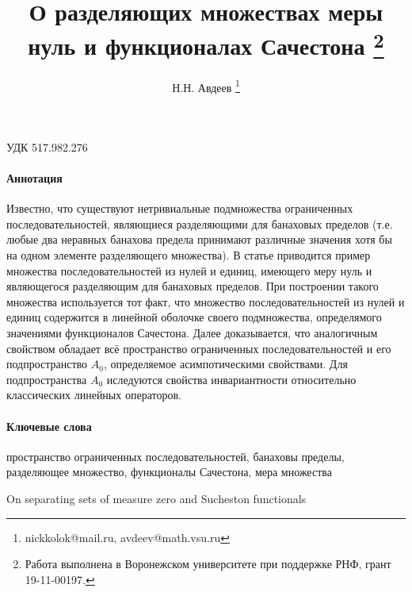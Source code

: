 \documentclass[a4paper,14pt]{article} %
\theoremstyle{plain}
\begin{document}

\title{
	О разделяющих множествах меры нуль и функционалах Сачестона
	\footnote{
		Работа выполнена в Воронежском университете при поддержке РНФ, грант 19-11-00197.
	}
}

\author{
	Н.Н. Авдеев
	\footnote{nickkolok@mail.ru, avdeev@math.vsu.ru}
}

\maketitle

УДК 517.982.276 %

\paragraph{Аннотация}
Известно, что существуют нетривиальные подмножества ограниченных последовательностей,
являющиеся разделяющими для банаховых пределов
(т.е. любые два неравных банахова предела принимают различные значения
хотя бы на одном элементе разделяющего множества).
В статье приводится пример множества последовательностей из нулей и единиц,
имеющего меру нуль и являющегося разделяющим для банаховых пределов.
При построении такого множества используется тот факт, что множество последовательностей
из нулей и единиц содержится в линейной оболочке своего подмножества,
определямого значениями функционалов Сачестона.
Далее доказывается, что аналогичным свойством обладает всё пространство ограниченных последовательностей
и его подпространство $A_0$, определяемое асимпотическими свойствами.
Для подпространства $A_0$ иследуются свойства инвариантности относительно классических линейных операторов.

\paragraph{Ключевые слова}
	пространство ограниченных последовательностей,
	банаховы пределы,
	разделяющее множество,
	функционалы Сачестона,
	мера множества


On separating sets of measure zero and Sucheston functionals
\end{document}
